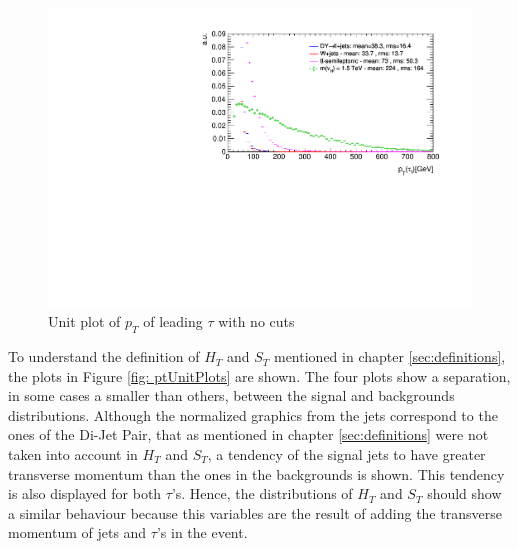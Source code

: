 \begin{figure}
\centering
\includegraphics[width=\linewidth]{Figures/Plots/tau1_pt_unitNC.pdf}
\caption{Unit plot of $p_{T}$ of leading $\tau$ with no cuts}
\label{fig: tau1ptunitNC}
\end{figure}

To understand the definition of $H_{T}$ and $S_{T}$ mentioned in chapter \ref{sec:definitions}, the plots in Figure \ref{fig: ptUnitPlots} are shown. The four plots show a separation, in some cases a smaller than others, between the signal and backgrounds distributions. Although the normalized graphics from the jets correspond to the ones of the Di-Jet Pair, that as mentioned in chapter \ref{sec:definitions} were not taken into account in $H_{T}$ and $S_{T}$, a tendency of the signal jets to have greater transverse momentum than the ones in the backgrounds is shown. This tendency is also displayed for both $\tau$'s. Hence, the distributions of $H_{T}$ and $S_{T}$ should show a similar behaviour because this variables are the result of adding the transverse momentum of jets and $\tau$'s in the event.

